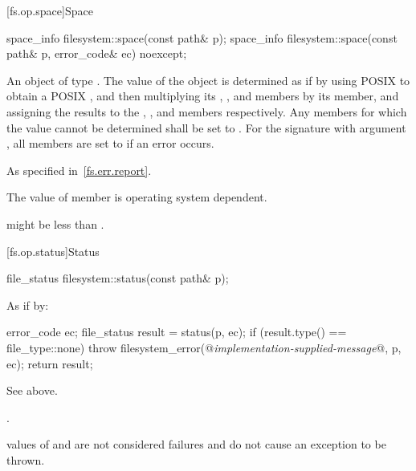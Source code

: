 [fs.op.space]{Space}

%
\begin{itemdecl}
space_info filesystem::space(const path& p);
space_info filesystem::space(const path& p, error_code& ec) noexcept;
\end{itemdecl}

\begin{itemdescr}
\pnum
\returns
An object of type . The value of the 
  object is determined as if by using POSIX 
  to obtain a POSIX ,
  and then multiplying its , ,
  and  members by its  member,
  and assigning the results to the , ,
  and  members respectively. Any members for which the
  value cannot be determined shall be set to .
  For the signature with argument , all members are set to
   if an error occurs.

\pnum
\throws
As specified in~\ref{fs.err.report}.

\pnum
\remarks
The value of member 
      is operating system dependent.
\begin{note}
 might be
      less than .
\end{note}
\end{itemdescr}


[fs.op.status]{Status}

%
\begin{itemdecl}
file_status filesystem::status(const path& p);
\end{itemdecl}

\begin{itemdescr}
\pnum
\effects
As if by:
\begin{codeblock}
error_code ec;
file_status result = status(p, ec);
if (result.type() == file_type::none)
  throw filesystem_error(@\textit{implementation-supplied-message}@, p, ec);
return result;
\end{codeblock}

\pnum
\returns
See above.

\pnum
\throws
{}.
\begin{note}
 values of 
  and  are not considered failures and do not
  cause an exception to be thrown.
\end{note}
\end{itemdescr}

